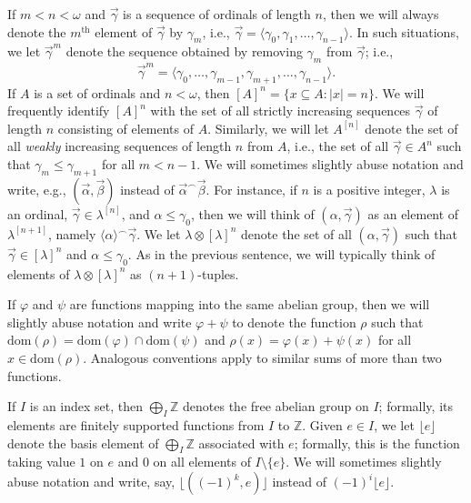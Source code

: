 \documentclass{amsart}
\numberwithin{theorem}{section}
\theoremstyle{definition}
\newcommand{\dom}{\mathrm{dom}}
\newcommand{\bb}{\mathbb}
\begin{document}
If $m < n < \omega$ and $\vec{\gamma}$ is a sequence of ordinals of length $n$, 
then we will always denote the $m^{\mathrm{th}}$ element of $\vec{\gamma}$ by 
$\gamma_m$, i.e., $\vec{\gamma} = \langle \gamma_0, \gamma_1, \ldots, \gamma_{n-1} \rangle$. 
In such situations, we let $\vec{\gamma}^m$ denote the sequence obtained 
by removing $\gamma_m$ from $\vec{\gamma}$; i.e.,
\[
  \vec{\gamma}^m = \langle \gamma_0, \ldots, \gamma_{m-1}, \gamma_{m+1}, \ldots, \gamma_{n-1} \rangle.
\] 
If $A$ is a set of ordinals and $n < \omega$, then 
$[A]^n = \{x \subseteq A : |x| = n\}$. We will frequently identify $[A]^n$ 
with the set of all strictly increasing sequences $\vec{\gamma}$ of length $n$ 
consisting of elements of $A$. Similarly, we will let $A^{[n]}$ denote the 
set of all \emph{weakly} increasing sequences of length $n$ from $A$, i.e., 
the set of all $\vec{\gamma} \in A^n$ such that $\gamma_m \leq \gamma_{m+1}$ for 
all $m < n-1$. We will sometimes slightly abuse notation and write, e.g., 
$(\vec{\alpha},\vec{\beta})$ instead of $\vec{\alpha}^\frown \vec{\beta}$. 
For instance, if $n$ is a positive integer, $\lambda$ is an ordinal, 
$\vec{\gamma} \in \lambda^{[n]}$, and $\alpha \leq \gamma_0$, then we will think 
of $(\alpha,\vec{\gamma})$ as an element of $\lambda^{[n+1]}$, namely 
$\langle \alpha \rangle ^\frown \vec{\gamma}$. We let 
$\lambda \otimes [\lambda]^n$ denote the set of all $(\alpha,\vec{\gamma})$ such that 
$\vec{\gamma} \in [\lambda]^n$ and $\alpha \leq \gamma_0$. As in the previous sentence, we 
will typically think of elements of $\lambda \otimes [\lambda]^n$ as $(n+1)$-tuples.

If $\varphi$ and $\psi$ are functions mapping into the same abelian group, 
then we will slightly 
abuse notation and write $\varphi + \psi$ to denote the function 
$\rho$ such that $\dom(\rho) = \dom(\varphi) \cap \dom(\psi)$ and 
$\rho(x) = \varphi(x) + \psi(x)$ for all $x \in \dom(\rho)$. Analogous conventions 
apply to similar sums of more than two functions.

If $I$ is an index set, then $\bigoplus_I \bb{Z}$ denotes the free abelian group on $I$; 
formally, its elements are finitely supported functions from $I$ to $\bb{Z}$. Given 
$e \in I$, we let $\lfloor e \rfloor$ denote the basis element of $\bigoplus_I \bb{Z}$ 
associated with $e$; formally, this is the function taking value $1$ on $e$ and $0$ on all 
elements of $I \setminus \{e\}$. We will sometimes slightly abuse notation and write, say, 
$\lfloor ((-1)^k,e) \rfloor$ instead of $(-1)^i \lfloor e \rfloor$.
\end{document}
